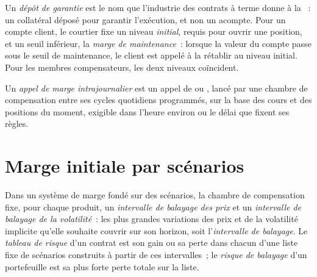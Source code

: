 \begin{definition}\label{def:m1:margin:bond}
Un \emph{dépôt de garantie} est le nom que l'industrie des contrats à
terme donne à la ~: un collatéral déposé pour garantir l'exécution, et non
un acompte. Pour un compte client, le courtier fixe un niveau \emph{initial},
requis pour ouvrir une position, et un seuil inférieur, la \emph{marge
de maintenance}~: lorsque la valeur du compte passe sous le
seuil de maintenance, le client est appelé à la rétablir au niveau
initial. Pour les membres compensateurs, les deux niveaux coïncident.
\end{definition}

\begin{definition}\label{def:m1:margin:intraday}
Un \emph{appel de marge intrajournalier} est un appel de
 ou , lancé par une chambre de compensation entre ses
cycles quotidiens programmés, sur la base des cours et des positions du moment, exigible
dans l'heure environ ou le délai que fixent ses règles.
\end{definition}

\section{Marge initiale par scénarios}

\begin{definition}\label{def:m1:margin:scan}
Dans un système de marge fondé sur des scénarios, la chambre de compensation fixe, pour chaque produit,
un \emph{intervalle de balayage des prix} et un \emph{intervalle de balayage de la volatilité}~: les plus
grandes variations des prix et de la volatilité implicite qu'elle souhaite couvrir sur son
horizon, soit l'\emph{intervalle de balayage}. Le \emph{tableau de
risque} d'un contrat est son gain ou sa perte dans chacun d'une liste fixe de
scénarios construits à partir de ces intervalles~; le \emph{risque de balayage} d'un portefeuille est sa
plus forte perte totale sur la liste.
\end{definition}

